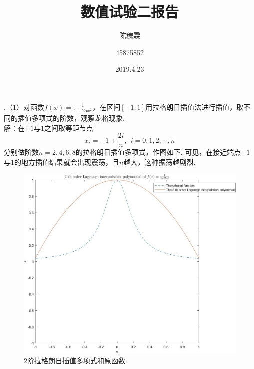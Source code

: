 \documentclass[10pt,a4paper]{article}
\title{数值试验二报告}
\author{陈稼霖 \and 45875852}
\date{2019.4.23}
\begin{document}
.（1）对函数$f(x)=\frac{1}{1+25x^2}$，在区间$[-1,1]$用拉格朗日插值法进行插值，取不同的插值多项式的阶数，观察龙格现象.\\
解：在$-1$与$1$之间取等距节点
\[
x_i=-1+\frac{2i}{n},~~i=0,1,2,\cdots,n
\]
分别做阶数$n=2,4,6,8$的拉格朗日插值多项式，作图如下. 可见，在接近端点$-1$与$1$的地方插值结果就会出现震荡，且$n$越大，这种振荡越剧烈.
\begin{figure}[H]
\centering
\includegraphics[scale=.4]{1_1_1.jpg}
\caption{2阶拉格朗日插值多项式和原函数}
\end{figure}
\newpage
\end{document}
